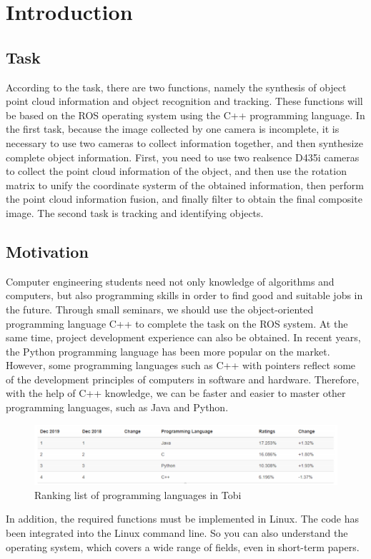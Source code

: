 \chapter{Introduction}
\section{Task}
According to the task, there are two functions, namely the synthesis of object point cloud information and object recognition and tracking. These functions will be based on the ROS operating system using the C++ programming language.
In the first task, because the image collected by one camera is incomplete, it is necessary to use two cameras to collect information together, and then synthesize complete object information. First, you need to use two realsence D435i cameras to collect the point cloud information of the object, and then use the rotation matrix to unify the coordinate systerm of the obtained information, then perform the point cloud information fusion, and finally filter to obtain the final composite image.
The second task is tracking and identifying objects.
\section{Motivation}
Computer engineering students need not only knowledge of algorithms and computers, but also programming skills in order to find good and suitable jobs in the future.
Through small seminars, we should use the object-oriented programming language C++ to complete the task on the ROS system.
At the same time, project development experience can also be obtained.
In recent years, the Python programming language has been more popular on the market. However, some programming languages such as C++ with pointers reflect some of the development principles of computers in software and hardware. Therefore, with the help of C++ knowledge, we can be faster and easier to master other programming languages, such as Java and Python.\\
\begin{figure}[htp]
	\centering %
	\includegraphics[width = 15.3cm]{figures/Motivation}
	\caption{Ranking list of programming languages in Tobi}
	\label{fig:figure1label}
\end{figure}

In addition, the required functions must be implemented in Linux. The code has been integrated into the Linux command line. So you can also understand the operating system, which covers a wide range of fields, even in short-term papers.



	
